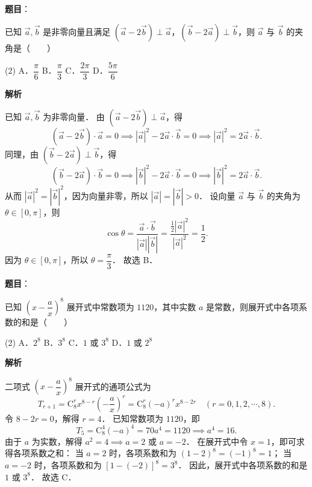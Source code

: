 \begin{answer}

\textbf{题目}：

已知 $\vec{a}, \vec{b}$ 是非零向量且满足 $(\vec{a} - 2\vec{b}) \perp \vec{a}$，$(\vec{b} - 2\vec{a}) \perp \vec{b}$，则 $\vec{a}$ 与 $\vec{b}$ 的夹角是\mbox{（　　）}

\begin{gkopts}(2)
\task A．$\dfrac{\pi}{6}$
\task B．$\dfrac{\pi}{3}$
\task C．$\dfrac{2\pi}{3}$
\task D．$\dfrac{5\pi}{6}$
\end{gkopts}

\textbf{解析}

已知 $\vec{a}, \vec{b}$ 为非零向量．
由 $(\vec{a} - 2\vec{b}) \perp \vec{a}$，得
\nopagebreak[4]
\[
(\vec{a} - 2\vec{b}) \cdot \vec{a} = 0 \implies |\vec{a}|^2 - 2\vec{a}\cdot\vec{b} = 0 \implies |\vec{a}|^2 = 2\vec{a}\cdot\vec{b}.
\]
同理，由 $(\vec{b} - 2\vec{a}) \perp \vec{b}$，得
\nopagebreak[4]
\[
(\vec{b} - 2\vec{a}) \cdot \vec{b} = 0 \implies |\vec{b}|^2 - 2\vec{a}\cdot\vec{b} = 0 \implies |\vec{b}|^2 = 2\vec{a}\cdot\vec{b}.
\]
从而 $|\vec{a}|^2 = |\vec{b}|^2$，因为向量非零，所以 $|\vec{a}| = |\vec{b}| > 0$．
设向量 $\vec{a}$ 与 $\vec{b}$ 的夹角为 $\theta \in [0, \pi]$，则
\nopagebreak[4]
\[
\cos\theta = \frac{\vec{a}\cdot\vec{b}}{|\vec{a}||\vec{b}|} = \frac{\frac{1}{2}|\vec{a}|^2}{|\vec{a}|^2} = \frac{1}{2}.
\]
因为 $\theta \in [0, \pi]$，所以 $\theta = \dfrac{\pi}{3}$．
故选 B．


\end{answer}
\begin{answer}

\textbf{题目}：

已知 $\left(x - \dfrac{a}{x}\right)^8$ 展开式中常数项为 $1120$，其中实数 $a$ 是常数，则展开式中各项系数的和是\mbox{（　　）}

\begin{gkopts}(2)
\task A．$2^8$
\task B．$3^8$
\task C．$1$ 或 $3^8$
\task D．$1$ 或 $2^8$
\end{gkopts}

\textbf{解析}

二项式 $\left(x - \dfrac{a}{x}\right)^8$ 展开式的通项公式为
\nopagebreak[4]
\[
T_{r+1} = \mathrm{C}_8^r x^{8-r} \left(-\frac{a}{x}\right)^r = \mathrm{C}_8^r (-a)^r x^{8-2r} \quad (r = 0, 1, 2, \cdots, 8).
\]
令 $8 - 2r = 0$，解得 $r = 4$．
已知常数项为 $1120$，即
\nopagebreak[4]
\[
T_5 = \mathrm{C}_8^4 (-a)^4 = 70a^4 = 1120 \implies a^4 = 16.
\]
由于 $a$ 为实数，解得 $a^2 = 4 \implies a = 2$ 或 $a = -2$．
在展开式中令 $x = 1$，即可求得各项系数之和：
当 $a = 2$ 时，各项系数和为 $(1 - 2)^8 = (-1)^8 = 1$；
当 $a = -2$ 时，各项系数和为 $[1 - (-2)]^8 = 3^8$．
因此，展开式中各项系数的和是 $1$ 或 $3^8$．
故选 C．


\end{answer}
